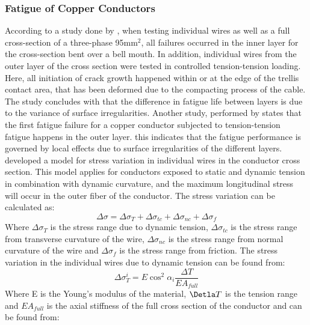 \subsubsection{Fatigue of Copper Conductors}
According to a study done by \cite{Nasution2013}, when testing individual wires as well as a full cross-section of a three-phase 95mm$^2$, all failures occurred in the inner layer for the cross-section bent over a bell mouth. In addition, individual wires from the outer layer of the cross section were tested in controlled tension-tension loading. Here, all initiation of crack growth happened within or at the edge of the trellis contact area, that has been deformed due to the compacting process of the cable. The study concludes with that the difference in fatigue life between layers is due to the variance of surface irregularities. Another study, performed by \cite{NASUTION2014} states that the first fatigue failure for a copper conductor subjected to tension-tension fatigue happens in the outer layer. this indicates that the fatigue performance is governed by local effects due to surface irregularities of the different layers. \newline
\newline
\noindent \cite{savik2014} developed a model for stress variation in individual wires in the conductor cross section. This model applies for conductors exposed to static and dynamic tension in combination with dynamic curvature, and the maximum longitudinal stress will occur in the outer fiber of the conductor. The stress variation can be calculated as:   
\begin{equation}
    \Delta \sigma = \Delta \sigma_T + \Delta \sigma_{tc} + \Delta \sigma_{nc} + \Delta \sigma_{f}
    \label{eq:stressvariation}
\end{equation}
\noindent Where $\Delta \sigma_T$ is the stress range due to dynamic tension, $\Delta \sigma_{tc}$ is the stress range from transverse curvature of the wire, $\Delta \sigma_{nc}$ is the stress range from normal curvature of the wire and $\Delta \sigma_{f}$ is the stress range from friction. The stress variation in the individual wires due to dynamic tension can be found from:
\begin{equation}
    \Delta \sigma_T^i = E \cos^2 \alpha_i \frac{\Delta T}{E A_{full}} 
\end{equation}
\noindent Where E is the Young's modulus of the material, $\Detla T$ is the tension range and $EA_{full}$  is the axial stiffness of the full cross section of the conductor and can be found from:
